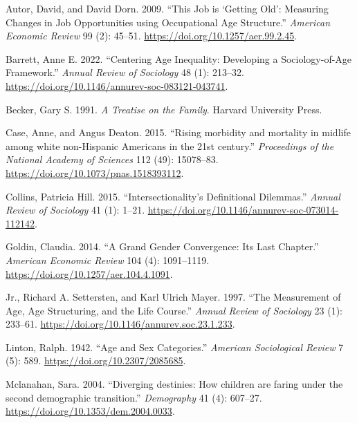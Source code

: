 \documentclass[
  letterpaper,
  DIV=11,
  numbers=noendperiod]{scrartcl}
\newlength{\cslhangindent}
\newlength{\cslentryspacingunit} %
\newenvironment{CSLReferences}[2] %
 {%
  \setlength{\parindent}{0pt}
  \ifodd #1
  \let\oldpar\par
  \def\par{\hangindent=\cslhangindent\oldpar}
  \fi
  \setlength{\parskip}{#2\cslentryspacingunit}
 }%
 {}
\theoremstyle{paper}
\begin{document}
\hypertarget{refs}{}
\begin{CSLReferences}{1}{0}
\leavevmode{}%
Autor, David, and David Dorn. 2009. {``{This Job is {`Getting Old'}:
Measuring Changes in Job Opportunities using Occupational Age
Structure}.''} \emph{American Economic Review} 99 (2): 45--51.
\url{https://doi.org/10.1257/aer.99.2.45}.

\leavevmode{}%
Barrett, Anne E. 2022. {``{Centering Age Inequality: Developing a
Sociology-of-Age Framework}.''} \emph{Annual Review of Sociology} 48
(1): 213--32. \url{https://doi.org/10.1146/annurev-soc-083121-043741}.

\leavevmode{}%
Becker, Gary S. 1991. \emph{{A Treatise on the Family}}. Harvard
University Press.

\leavevmode{}%
Case, Anne, and Angus Deaton. 2015. {``{Rising morbidity and mortality
in midlife among white non-Hispanic Americans in the 21st century}.''}
\emph{Proceedings of the National Academy of Sciences} 112 (49):
15078--83. \url{https://doi.org/10.1073/pnas.1518393112}.

\leavevmode{}%
Collins, Patricia Hill. 2015. {``{Intersectionality's Definitional
Dilemmas}.''} \emph{Annual Review of Sociology} 41 (1): 1--21.
\url{https://doi.org/10.1146/annurev-soc-073014-112142}.

\leavevmode{}%
Goldin, Claudia. 2014. {``{A Grand Gender Convergence: Its Last
Chapter}.''} \emph{American Economic Review} 104 (4): 1091--1119.
\url{https://doi.org/10.1257/aer.104.4.1091}.

\leavevmode{}%
Jr., Richard A. Settersten, and Karl Ulrich Mayer. 1997. {``{The
Measurement of Age, Age Structuring, and the Life Course}.''}
\emph{Annual Review of Sociology} 23 (1): 233--61.
\url{https://doi.org/10.1146/annurev.soc.23.1.233}.

\leavevmode{}%
Linton, Ralph. 1942. {``{Age and Sex Categories}.''} \emph{American
Sociological Review} 7 (5): 589. \url{https://doi.org/10.2307/2085685}.

\leavevmode{}%
Mclanahan, Sara. 2004. {``{Diverging destinies: How children are faring
under the second demographic transition}.''} \emph{Demography} 41 (4):
607--27. \url{https://doi.org/10.1353/dem.2004.0033}.


\end{CSLReferences}
\end{document}
